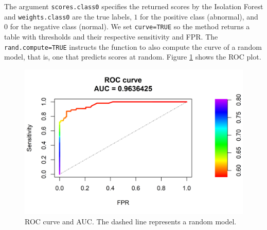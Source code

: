 \documentclass[
  11pt,
]{krantz}
\newenvironment{Shaded}{\begin{snugshade}}{\end{snugshade}}
\newcommand{\AttributeTok}[1]{\textcolor[rgb]{0.61,0.61,0.61}{#1}}
\newcommand{\CommentTok}[1]{\textcolor[rgb]{0.37,0.37,0.37}{\textit{#1}}}
\newcommand{\ConstantTok}[1]{\textcolor[rgb]{0,0,0}{#1}}
\newcommand{\FunctionTok}[1]{\textcolor[rgb]{0,0,0}{#1}}
\newcommand{\NormalTok}[1]{#1}
\newcommand{\OtherTok}[1]{\textcolor[rgb]{0.37,0.37,0.37}{#1}}
\newcommand{\SpecialCharTok}[1]{\textcolor[rgb]{0,0,0}{#1}}
\begin{document}
\begin{Shaded}
\end{Shaded}

The argument \texttt{scores.class0} specifies the returned scores by the Isolation Forest and \texttt{weights.class0} are the true labels, \(1\) for the positive class (abnormal), and \(0\) for the negative class (normal). We set \texttt{curve=TRUE} so the method returns a table with thresholds and their respective sensitivity and FPR. The \texttt{rand.compute=TRUE} instructs the function to also compute the curve of a random model, that is, one that predicts scores at random. Figure \ref{fig:rocCurve} shows the ROC plot.



\begin{figure}

{\centering \includegraphics[width=0.9\linewidth]{images/roc_curve} 

}

\caption{ROC curve and AUC. The dashed line represents a random model.}\label{fig:rocCurve}
\end{figure}
\end{document}
